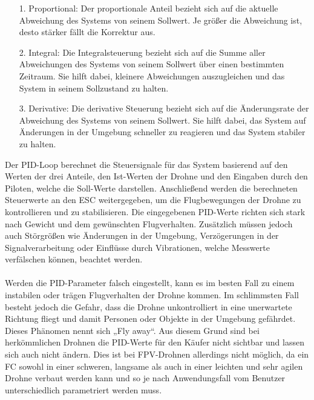             \begin{itemize}
                \item[1.] Proportional: Der proportionale Anteil bezieht sich auf die aktuelle Abweichung des Systems von seinem Sollwert. Je größer die Abweichung ist, desto stärker fällt die Korrektur aus.
                \item[2.] Integral: Die Integralsteuerung bezieht sich auf die Summe aller Abweichungen des Systems von seinem Sollwert über einen bestimmten Zeitraum. Sie hilft dabei, kleinere Abweichungen auszugleichen und das System in seinem Sollzustand zu halten.
                \item[3.] Derivative: Die derivative Steuerung bezieht sich auf die Änderungsrate der Abweichung des Systems von seinem Sollwert. Sie hilft dabei, das System auf Änderungen in der Umgebung schneller zu reagieren und das System stabiler zu halten.
            \end{itemize}

            Der PID-Loop berechnet die Steuersignale für das System basierend auf den Werten der drei
            Anteile, den Ist-Werten der Drohne und den Eingaben durch den Piloten, welche die Soll-Werte
            darstellen. Anschließend werden die berechneten Steuerwerte an den ESC weitergegeben, um
            die Flugbewegungen der Drohne zu kontrollieren und zu stabilisieren. Die eingegebenen PID-Werte
            richten sich stark nach Gewicht und dem gewünschten Flugverhalten. Zusätzlich müssen jedoch
            auch Störgrößen wie Änderungen in der Umgebung, Verzögerungen in der Signalverarbeitung oder
            Einflüsse durch Vibrationen, welche Messwerte verfälschen können, beachtet werden. \\
            \\
            Werden die PID-Parameter falsch eingestellt, kann es im besten Fall zu einem instabilen oder
            trägen Flugverhalten der Drohne kommen. Im schlimmsten Fall besteht jedoch die Gefahr, dass
            die Drohne unkontrolliert in eine unerwartete Richtung fliegt und damit Personen oder Objekte
            in der Umgebung gefährdet. Dieses Phänomen nennt sich „Fly away“. Aus diesem Grund sind bei
            herkömmlichen Drohnen die PID-Werte für den Käufer nicht sichtbar und lassen sich auch nicht
            ändern. Dies ist bei FPV-Drohnen allerdings nicht möglich, da ein FC sowohl in einer schweren,
            langsame als auch in einer leichten und sehr agilen Drohne verbaut werden kann und so je nach
            Anwendungsfall vom Benutzer unterschiedlich parametriert werden muss.

